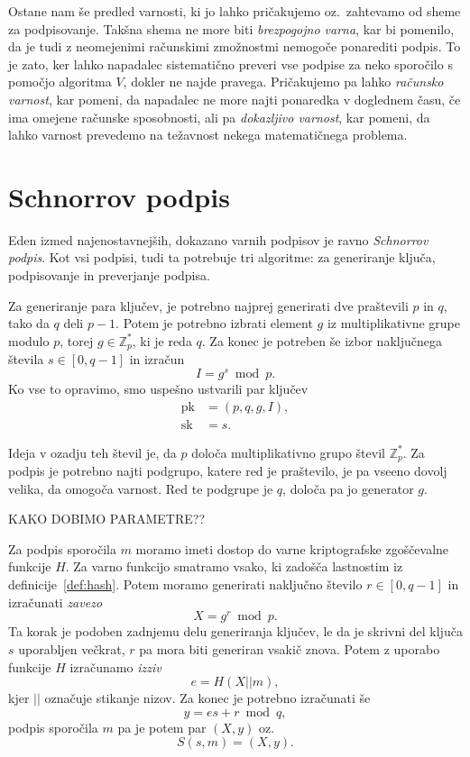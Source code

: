 \documentclass[isrm2, tisk]{fmfdelo}
\newcommand{\Z}{\mathbb Z}
\begin{document}
Ostane nam še predled varnosti, ki jo lahko pričakujemo oz.\ zahtevamo od sheme za podpisovanje. 
Takšna shema ne more biti \textit{brezpogojno varna}, kar bi pomenilo, da je tudi z neomejenimi 
računskimi zmožnostmi nemogoče ponarediti podpis. To je zato, ker lahko napadalec sistematično 
preveri vse podpise za neko sporočilo s pomočjo algoritma $V$, dokler ne najde pravega. Pričakujemo 
pa lahko \textit{računsko varnost}, kar pomeni, da napadalec ne more najti ponaredka v doglednem času,
če ima omejene računske sposobnosti, ali pa \textit{dokazljivo varnost}, kar pomeni, da lahko 
varnost prevedemo na težavnost nekega matematičnega problema.

\section{Schnorrov podpis}
Eden izmed najenostavnejših, dokazano varnih podpisov je ravno \textit{Schnorrov podpis}. Kot vsi 
podpisi, tudi ta potrebuje tri algoritme: za generiranje ključa, podpisovanje in preverjanje 
podpisa. 

Za generiranje para ključev, je potrebno najprej generirati dve praštevili $p$ in $q$, tako da $q$ 
deli $p-1$. Potem je potrebno izbrati element $g$ iz multiplikativne grupe modulo $p$, torej 
$g \in \Z_p^*$, ki je reda $q$. Za konec je potreben še izbor naključnega števila $s \in [0, q - 1]$
in izračun 
$$ 
I = g^s \bmod p.
$$
Ko vse to opravimo, smo uspešno ustvarili par ključev
\begin{align*}
\text{pk} &= (p, q, g, I), \\
\text{sk} &= s.
\end{align*}

Ideja v ozadju teh števil je, da $p$ določa multiplikativno grupo števil $\Z_p^*$. Za podpis je 
potrebno najti podgrupo, katere red je praštevilo, je pa vseeno dovolj velika, da omogoča varnost. 
Red te podgrupe je $q$, določa pa jo generator $g$. 

KAKO DOBIMO PARAMETRE??

Za podpis sporočila $m$ moramo imeti dostop do varne kriptografske zgoščevalne funkcije $H$. Za varno 
funkcijo smatramo vsako, ki zadošča lastnostim iz definicije~\ref{def:hash}. Potem moramo generirati 
naključno število $r \in [0, q-1]$ in izračunati \textit{zavezo} 
$$ 
X = g^r \bmod p.
$$ 
Ta korak je podoben zadnjemu delu generiranja ključev, le da je skrivni del ključa $s$ uporabljen 
večkrat, $r$ pa mora biti generiran vsakič znova. Potem z uporabo funkcije $H$ izračunamo 
\textit{izziv} 
$$
e = H(X || m),
$$ 
kjer $||$ označuje stikanje nizov. Za konec je potrebno izračunati še 
$$ 
y = es + r \bmod q, 
$$
podpis sporočila $m$ pa je potem par $(X, y)$ oz.\ 
$$ 
S(s, m) = (X, y).
$$
\end{document}
